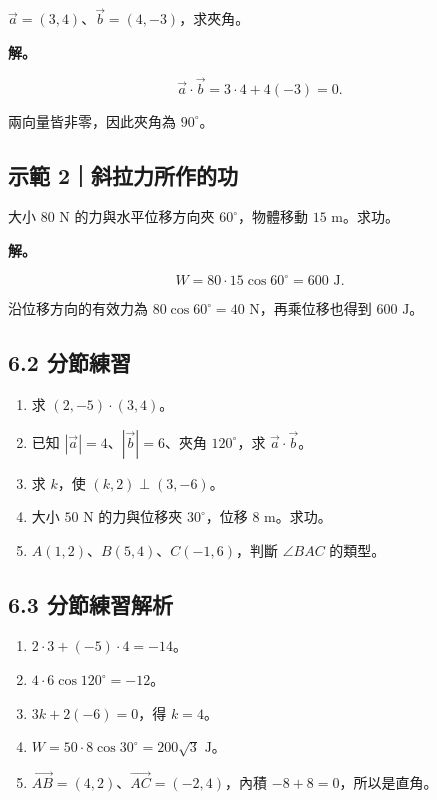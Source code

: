 \documentclass[11pt,a4paper]{article}
\providecommand{\tightlist}{%
  \setlength{\itemsep}{0pt}\setlength{\parskip}{0pt}}
\begin{document}
\(\vec a=(3,4)\)、\(\vec b=(4,-3)\)，求夾角。

\textbf{解。}

\[
\vec a\cdot\vec b=3\cdot4+4(-3)=0.
\]

兩向量皆非零，因此夾角為 \(90^\circ\)。

\subsection{示範 2｜斜拉力所作的功}\label{ux793aux7bc4-2ux659cux62c9ux529bux6240ux4f5cux7684ux529f}

大小 \(80\text{ N}\) 的力與水平位移方向夾 \(60^\circ\)，物體移動 \(15\text{ m}\)。求功。

\textbf{解。}

\[
W=80\cdot15\cos60^\circ=600\text{ J}.
\]

沿位移方向的有效力為 \(80\cos60^\circ=40\text{ N}\)，再乘位移也得到 \(600\text{ J}\)。

\subsection{6.2 分節練習}\label{ux5206ux7bc0ux7df4ux7fd2-5}

\begin{enumerate}
\def\labelenumi{\arabic{enumi}.}
\tightlist
\item
  求 \((2,-5)\cdot(3,4)\)。
\item
  已知 \(|\vec a|=4\)、\(|\vec b|=6\)、夾角 \(120^\circ\)，求 \(\vec a\cdot\vec b\)。
\item
  求 \(k\)，使 \((k,2)\perp(3,-6)\)。
\item
  大小 \(50\text{ N}\) 的力與位移夾 \(30^\circ\)，位移 \(8\text{ m}\)。求功。
\item
  \(A(1,2)\)、\(B(5,4)\)、\(C(-1,6)\)，判斷 \(\angle BAC\) 的類型。
\end{enumerate}

\subsection{6.3 分節練習解析}\label{ux5206ux7bc0ux7df4ux7fd2ux89e3ux6790-5}

\begin{enumerate}
\def\labelenumi{\arabic{enumi}.}
\tightlist
\item
  \(2\cdot3+(-5)\cdot4=-14\)。
\item
  \(4\cdot6\cos120^\circ=-12\)。
\item
  \(3k+2(-6)=0\)，得 \(k=4\)。
\item
  \(W=50\cdot8\cos30^\circ=200\sqrt3\text{ J}\)。
\item
  \(\overrightarrow{AB}=(4,2)\)、\(\overrightarrow{AC}=(-2,4)\)，內積 \(-8+8=0\)，所以是直角。
\end{enumerate}
\end{document}
